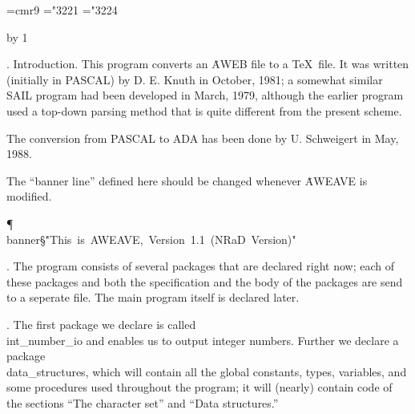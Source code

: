 

\def\hang{\hangindent 3em\indent\ignorespaces}
\font\ninerm=cmr9
\let\mc=\ninerm %
\def\ADA{{\mc ADA}}
\def\ab{$\.|\ldots\.|$} %
\def\v{\.{\char'174}} %
\def\dleft{[\![} \def\dright{]\!]} %
\mathchardef\RA="3221 %
\mathchardef\BA="3224 %
\def\({} %

\def\title{AWEAVE}
\def\contentspagenumber{13} %
\def\topofcontents{\null\vfill
  \titlefalse %
  \def\rheader{\mainfont Appendix D\hfil \contentspagenumber}
  \centerline{\titlefont The {\ttitlefont AWEAVE} processor}
  \vskip 15pt
  \centerline{(based on {\tt WEAVE} Version 2.8)}
  \centerline{\ninerm[ADA-Version 1.0]}
  \vfill}
\pageno=\contentspagenumber \advance\pageno by 1


.  Introduction.
This program converts an \.{AWEB} file to a \TeX\ file. It was written
(initially in {\mc PASCAL})
by D. E. Knuth in October, 1981; a somewhat similar {\mc SAIL} program had
been developed in March, 1979, although the earlier program used a top-down
parsing method that is quite different from the present scheme.

The conversion from {\mc PASCAL} to {\mc ADA} has been done by
U. Schweigert in May, 1988.

The ``banner line'' defined here should be changed whenever \.{AWEAVE}
is modified.

\Y\P\4\D\\{banner}\?\S\?\.{"This\ is\ AWEAVE,\ Version\ 1.1\ (NRaD\ Version)"}%
\?\6
\?\par
\fi

. The program consists of several packages that are declared right now;
each of these packages and both the specification and the body of
the packages are send to a seperate file. The main program itself
is declared later.

\fi

\*. The first package we declare is called \\{int\_number\_io} and enables
us
to output integer numbers. Further we declare a package \\{data\_structures},
which will contain all the global constants, types, variables, and some
procedures used throughout the program; it will (nearly) contain code of
the sections ``The character set'' and ``Data structures.''


